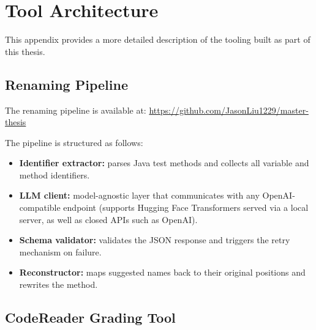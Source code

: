 




\chapter{Tool Architecture}
\label{ch:tool_architecture}

This appendix provides a more detailed description of the tooling built as part of this thesis.

\section*{Renaming Pipeline}

The renaming pipeline is available at:
\url{https://github.com/JasonLiu1229/master-thesis}

The pipeline is structured as follows:
\begin{itemize}
  \item \textbf{Identifier extractor:} parses Java test methods and collects all variable
        and method identifiers.
  \item \textbf{LLM client:} model-agnostic layer that communicates with any
        OpenAI-compatible endpoint (supports Hugging Face Transformers served via a local
        server, as well as closed APIs such as OpenAI).
  \item \textbf{Schema validator:} validates the JSON response and triggers the retry
        mechanism on failure.
  \item \textbf{Reconstructor:} maps suggested names back to their original positions and
        rewrites the method.
\end{itemize}

\section*{CodeReader Grading Tool}

